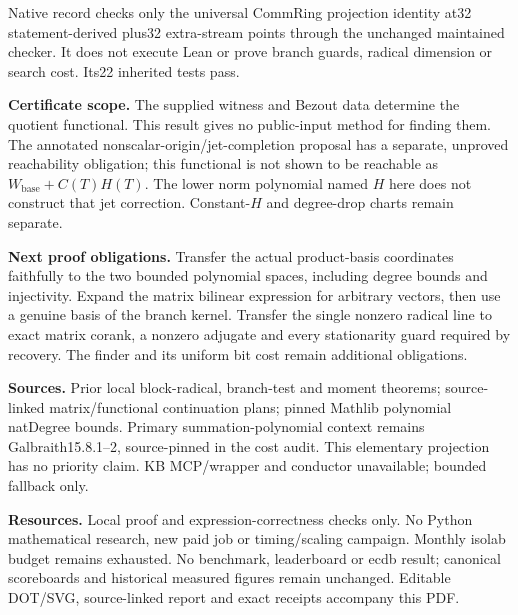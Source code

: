 \documentclass[11pt]{article}
\begin{document}
Native record  checks only the universal CommRing
projection identity at32 statement-derived plus32 extra-stream points through
the unchanged maintained checker. It does not execute Lean or prove branch
guards, radical dimension or search cost. Its22 inherited tests pass.

\textbf{Certificate scope.} The supplied witness and Bezout data determine
the quotient functional. This result gives no public-input method for finding
them. The annotated nonscalar-origin/jet-completion proposal has a separate,
unproved reachability obligation; this functional is not shown to be reachable
as $W_{\mathrm{base}}+C(T)H(T)$. The lower norm polynomial named $H$ here does
not construct that jet correction. Constant-$H$ and degree-drop charts remain
separate.

\textbf{Next proof obligations.} Transfer the actual product-basis coordinates
faithfully to the two bounded polynomial spaces, including degree bounds and
injectivity. Expand the matrix bilinear expression for arbitrary vectors, then
use a genuine basis of the branch kernel. Transfer the single nonzero radical
line to exact matrix corank, a nonzero adjugate and every stationarity guard
required by recovery. The finder and its uniform bit cost remain additional
obligations.

\textbf{Sources.} Prior local block-radical, branch-test and moment theorems;
source-linked matrix/functional continuation plans; pinned Mathlib polynomial
natDegree bounds. Primary summation-polynomial context remains Galbraith15.8.1--2,
source-pinned in the cost audit. This elementary projection has no priority claim.
KB MCP/wrapper and conductor unavailable; bounded fallback only.

\textbf{Resources.} Local proof and expression-correctness checks only. No
Python mathematical research, new paid job or timing/scaling campaign. Monthly
isolab budget remains exhausted. No benchmark, leaderboard or ecdb result;
canonical scoreboards and historical measured figures remain unchanged.
Editable DOT/SVG, source-linked report and exact receipts accompany this PDF.
\end{document}
